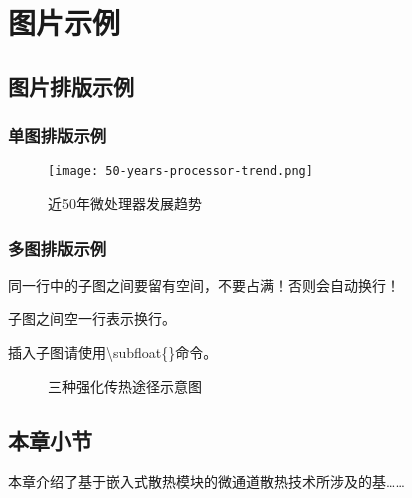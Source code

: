 \chapter{图片示例}\label{ch:2}

\section{图片排版示例}

\subsection{单图排版示例}

\begin{figure}[htb]
    \texttt{[image: 50-years-processor-trend.png]}
    \caption[处理器发展]{近50年微处理器发展趋势} %
    \label{fig:processor-trend}
\end{figure}

\subsection{多图排版示例}
同一行中的子图之间要留有空间，不要占满！否则会自动换行！

子图之间空一行表示换行。

插入子图请使用\textbackslash subfloat\{\}命令。

\begin{figure}[htb]

    \caption{三种强化传热途径示意图}
    \label{fig:Three-enhanced-heat-transfer-paths}
\end{figure}

\section{本章小节}
本章介绍了基于嵌入式散热模块的微通道散热技术所涉及的基……